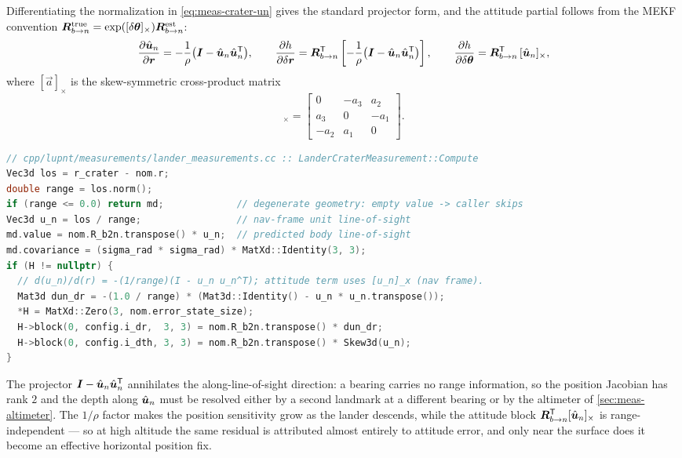 Differentiating the normalization in \cref{eq:meas-crater-un} gives the
standard projector form, and the attitude partial follows from the MEKF
convention
$\bm{R}^\mathrm{true}_{b\to n} = \exp([\delta\bm{\theta}]_\times)
\bm{R}^\mathrm{est}_{b\to n}$:
\begin{equation}
  \frac{\partial \hat{\bm{u}}_n}{\partial \bm{r}}
    = -\frac{1}{\rho}\big(\bm{I} - \hat{\bm{u}}_n\hat{\bm{u}}_n^{\mathsf{T}}\big),
  \qquad
  \frac{\partial h}{\partial \delta\bm{r}}
    = \bm{R}_{b\to n}^{\mathsf{T}}
      \left[-\frac{1}{\rho}\big(\bm{I} - \hat{\bm{u}}_n\hat{\bm{u}}_n^{\mathsf{T}}\big)\right],
  \qquad
  \frac{\partial h}{\partial \delta\bm{\theta}}
    = \bm{R}_{b\to n}^{\mathsf{T}}\,[\hat{\bm{u}}_n]_\times ,
  \label{eq:meas-crater-jac}
\end{equation}
where $[\vec{a}]_\times$ is the skew-symmetric cross-product matrix
\begin{equation}
  [\vec{a}]_\times =
  \begin{bmatrix}
    0 & -a_3 & a_2 \\ a_3 & 0 & -a_1 \\ -a_2 & a_1 & 0
  \end{bmatrix}.
  \label{eq:meas-skew}
\end{equation}

\begin{lstlisting}[language=cpp, caption={Crater bearing: prediction and the
  position/attitude-coupled Jacobian.}, label={lst:meas-crater}]
// cpp/lupnt/measurements/lander_measurements.cc :: LanderCraterMeasurement::Compute
Vec3d los = r_crater - nom.r;
double range = los.norm();
if (range <= 0.0) return md;             // degenerate geometry: empty value -> caller skips
Vec3d u_n = los / range;                 // nav-frame unit line-of-sight
md.value = nom.R_b2n.transpose() * u_n;  // predicted body line-of-sight
md.covariance = (sigma_rad * sigma_rad) * MatXd::Identity(3, 3);
if (H != nullptr) {
  // d(u_n)/d(r) = -(1/range)(I - u_n u_n^T); attitude term uses [u_n]_x (nav frame).
  Mat3d dun_dr = -(1.0 / range) * (Mat3d::Identity() - u_n * u_n.transpose());
  *H = MatXd::Zero(3, nom.error_state_size);
  H->block(0, config.i_dr,  3, 3) = nom.R_b2n.transpose() * dun_dr;
  H->block(0, config.i_dth, 3, 3) = nom.R_b2n.transpose() * Skew3d(u_n);
}
\end{lstlisting}

The projector $\bm{I} - \hat{\bm{u}}_n\hat{\bm{u}}_n^{\mathsf{T}}$ annihilates the
along-line-of-sight direction: a bearing carries no range information, so the
position Jacobian has rank $2$ and the depth along $\hat{\bm{u}}_n$ must be
resolved either by a second landmark at a different bearing or by the
altimeter of \cref{sec:meas-altimeter}. The $1/\rho$ factor makes the position
sensitivity grow as the lander descends, while the attitude block
$\bm{R}_{b\to n}^{\mathsf{T}}[\hat{\bm{u}}_n]_\times$ is range-independent --- so at
high altitude the same residual is attributed almost entirely to attitude
error, and only near the surface does it become an effective horizontal
position fix.

